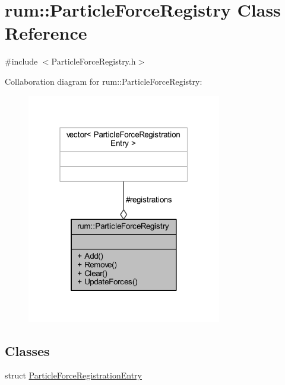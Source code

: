 \hypertarget{classrum_1_1_particle_force_registry}{}\section{rum\+:\+:Particle\+Force\+Registry Class Reference}
\label{classrum_1_1_particle_force_registry}


{\ttfamily \#include $<$Particle\+Force\+Registry.\+h$>$}



Collaboration diagram for rum\+:\+:Particle\+Force\+Registry\+:\nopagebreak
\begin{figure}[H]
\begin{center}
\leavevmode
\includegraphics[width=241pt]{classrum_1_1_particle_force_registry__coll__graph}
\end{center}
\end{figure}
\subsection*{Classes}
\begin{DoxyCompactItemize}
\item 
struct \hyperlink{structrum_1_1_particle_force_registry_1_1_particle_force_registration_entry}{Particle\+Force\+Registration\+Entry}
\end{DoxyCompactItemize}
